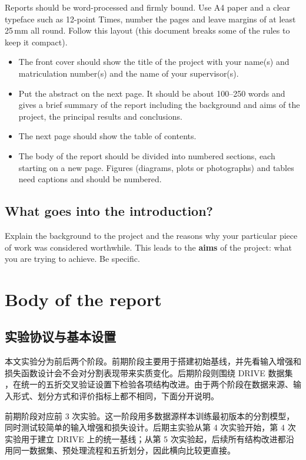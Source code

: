 \documentclass[a4paper,12pt]{article}
\begin{document}
Reports should be word-processed and firmly bound. Use A4 paper and a clear typeface such as 12-point Times, number the pages and leave margins of at least 25\,mm all round. Follow this layout (this document breaks some of the rules to keep it compact).
\begin{itemize}
\item
The front cover should show the title of the project with your name(s) and matriculation number(s) and the name of your supervisor(s).
\item
Put the abstract on the next page. It should be about 100--250 words and gives a brief summary of the report including the background and aims of the project, the principal results and conclusions.
\item
The next page should show the table of contents. 
\item
The body of the report should be divided into numbered sections, each starting on a new page. Figures (diagrams, plots or photographs) and tables need captions and should be numbered.
\end{itemize}

\subsection{What goes into the introduction?}

Explain the background to the project and the reasons why your particular piece of work was considered worthwhile. This leads to the \textbf{aims} of the project: what you are trying to achieve. Be specific.


\section{Body of the report}

\subsection{实验协议与基本设置}

本文实验分为前后两个阶段。前期阶段主要用于搭建初始基线，并先看输入增强和损失函数设计会不会对分割表现带来实质变化。后期阶段则围绕 DRIVE 数据集 \cite{staal2004drive}，在统一的五折交叉验证设置下检验各项结构改进。由于两个阶段在数据来源、输入形式、划分方式和评价指标上都不相同，下面分开说明。

前期阶段对应前 3 次实验。这一阶段用多数据源样本训练最初版本的分割模型，同时测试较简单的输入增强和损失设计。后期主实验从第 4 次实验开始，第 4 次实验用于建立 DRIVE 上的统一基线；从第 5 次实验起，后续所有结构改进都沿用同一数据集、预处理流程和五折划分，因此横向比较更直接。
\end{document}
